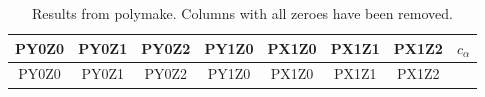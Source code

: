 \documentclass[
]{article}
\theoremstyle{plain}
\begin{document}
\begin{longtable}[]{@{}cccccccc@{}}
\caption{Results from polymake. Columns with all zeroes have been removed.}\tabularnewline
\toprule
\begin{minipage}[b]{0.09\columnwidth}\centering
PY0Z0\strut
\end{minipage} & \begin{minipage}[b]{0.09\columnwidth}\centering
PY0Z1\strut
\end{minipage} & \begin{minipage}[b]{0.09\columnwidth}\centering
PY0Z2\strut
\end{minipage} & \begin{minipage}[b]{0.09\columnwidth}\centering
PY1Z0\strut
\end{minipage} & \begin{minipage}[b]{0.09\columnwidth}\centering
PX1Z0\strut
\end{minipage} & \begin{minipage}[b]{0.09\columnwidth}\centering
PX1Z1\strut
\end{minipage} & \begin{minipage}[b]{0.09\columnwidth}\centering
PX1Z2\strut
\end{minipage} & \begin{minipage}[b]{0.16\columnwidth}\centering
\(c_{\alpha}\)\strut
\end{minipage}\tabularnewline
\midrule
\endfirsthead
\toprule
\begin{minipage}[b]{0.09\columnwidth}\centering
PY0Z0\strut
\end{minipage} & \begin{minipage}[b]{0.09\columnwidth}\centering
PY0Z1\strut
\end{minipage} & \begin{minipage}[b]{0.09\columnwidth}\centering
PY0Z2\strut
\end{minipage} & \begin{minipage}[b]{0.09\columnwidth}\centering
PY1Z0\strut
\end{minipage} & \begin{minipage}[b]{0.09\columnwidth}\centering
PX1Z0\strut
\end{minipage} & \begin{minipage}[b]{0.09\columnwidth}\centering
PX1Z1\strut
\end{minipage} & \begin{minipage}[b]{0.09\columnwidth}\centering
PX1Z2\strut
\end{minipage} & \begin{minipage}[b]{0.16\columnwidth}\centering

\end{minipage}
\end{longtable}
\end{document}
